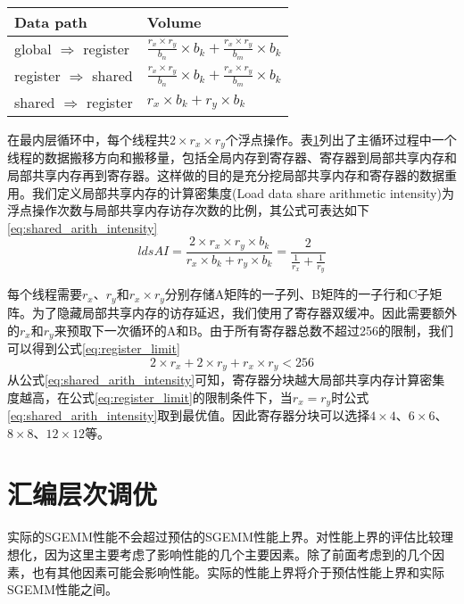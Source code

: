\begin{table}[htbp]
	\label{tab:thread_data_move}
	\begin{center}
		\begin{tabular}{ | l | l | }
			\hline
			Data path & Volume  \\ \hline
			global $\Rightarrow$ register & $\frac{r_x \times r_y}{b_n} \times b_k + \frac{r_x \times r_y}{b_m} \times b_k$  \\ \hline
			register $\Rightarrow$ shared & $\frac{r_x \times r_y}{b_n} \times b_k + \frac{r_x \times r_y}{b_m} \times b_k$  \\ \hline
			shared $\Rightarrow$ register & $r_x \times b_k + r_y \times b_k$ \\
			\hline
		\end{tabular}
	\end{center}	
\end{table}
在最内层循环中，每个线程共$2 \times r_x \times r_y$个浮点操作。表\ref{tab:thread_data_move}列出了主循环过程中一个线程的数据搬移方向和搬移量，包括全局内存到寄存器、寄存器到局部共享内存和局部共享内存再到寄存器。这样做的目的是充分挖局部共享内存和寄存器的数据重用。我们定义局部共享内存的计算密集度(Load data share arithmetic intensity)为浮点操作次数与局部共享内存访存次数的比例，其公式可表达如下\ref{eq:shared_arith_intensity}
\begin{equation}
\label{eq:shared_arith_intensity}
ldsAI = \frac{2 \times r_x \times r_y \times b_k}{r_x \times b_k + r_y \times b_k} = \frac{2}{\frac{1}{r_x} + \frac{1}{r_y}}
\end{equation}

每个线程需要$r_x$、$r_y$和$r_x \times r_y$分别存储A矩阵的一子列、B矩阵的一子行和C子矩阵。为了隐藏局部共享内存的访存延迟，我们使用了寄存器双缓冲。因此需要额外的$r_x$和$r_y$来预取下一次循环的A和B。由于所有寄存器总数不超过256的限制，我们可以得到公式\ref{eq:register_limit}
\begin{equation}
\label{eq:register_limit}
2 \times r_x + 2 \times r_y + r_x \times r_y < 256
\end{equation}
从公式\ref{eq:shared_arith_intensity}可知，寄存器分块越大局部共享内存计算密集度越高，在公式\ref{eq:register_limit}的限制条件下，当$r_x = r_y$时公式\ref{eq:shared_arith_intensity}取到最优值。因此寄存器分块可以选择$4\times 4$、$6\times 6$、$8\times8$、$12\times 12$等。
\section{汇编层次调优}
实际的SGEMM性能不会超过预估的SGEMM性能上界。对性能上界的评估比较理想化，因为这里主要考虑了影响性能的几个主要因素。除了前面考虑到的几个因素，也有其他因素可能会影响性能。实际的性能上界将介于预估性能上界和实际SGEMM性能之间。

